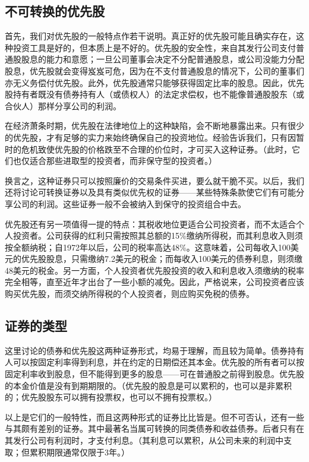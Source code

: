 \documentclass[12pt,oneside]{book}
\begin{document}
\subsection{不可转换的优先股}
首先，我们对优先股的一般特点作若干说明。真正好的优先股可能且确实存在，这种投资工具是好的，但本质上是不好的。优先股的安全性，来自其发行公司支付普通股股息的能力和意愿；一旦公司董事会决定不分配普通股息，或公司没能力分配股息，优先股就会变得岌岌可危，因为在不支付普通股息的情况下，公司的董事们亦无义务偿付优先股。此外，优先股通常只能够获得固定比率的股息。因此，优先股持有者既没有债券持有人（或债权人）的法定求偿权，也不能像普通股股东（或合伙人）那样分享公司的利润。

在经济萧条时期，优先股在法律地位上的这种缺陷，会不断地暴露出来。只有很少的优先股，才有足够的实力来始终确保自己的投资地位。经验告诉我们，只有因暂时的危机致使优先股的价格跌至不合理的价位时，才可买入这种证券。（此时，它们也仅适合那些进取型的投资者，而非保守型的投资者。）

换言之，这种证券只可以按照廉价的交易条件买进，要么就干脆不买。以后，我们还将讨论可转换证券以及具有类似优先权的证券——某些特殊条款使它们有可能分享公司的利润。这些证券一般不会被纳入到保守的投资组合中去。

优先股还有另一项值得一提的特点：其税收地位更适合公司投资者，而不太适合个人投资者。公司获得的红利只需按照其总额的15\%缴纳所得税，而其利息收入则须按全额纳税；自1972年以后，公司的税率高达48\%。这意味着，公司每收入100美元的优先股股息，只需缴纳7.2美元的税金；而每收入100美元的债券利息，则须缴48美元的税金。另一方面，个人投资者优先股投资的收入和利息收入须缴纳的税率完全相等，直至近年才出台了一些小额的减免。因此，严格说来，公司投资者应该购买优先股，而须交纳所得税的个人投资者，则应购买免税的债券。

\subsection{证券的类型}
这里讨论的债券和优先股这两种证券形式，均易于理解，而且较为简单。债券持有人可以按固定利率得到利息，并在约定的日期偿还其本金。优先股的所有者可以按固定利率收到股息，但不能得到更多的股息——可在普通股之前得到股息。优先股的本金价值是没有到期期限的。（优先股的股息是可以累积的，也可以是非累积的；优先股股东可以拥有投票权，也可以不拥有投票权。）

以上是它们的一般特性，而且这两种形式的证券比比皆是。但不可否认，还有一些与其颇有差别的证券。其中最著名当属可转换的同类债券和收益债券。后者只有在其发行公司有利润时，才支付利息。（其利息可以累积，从公司未来的利润中支取；但累积期限通常仅限于3年。）
\end{document}
